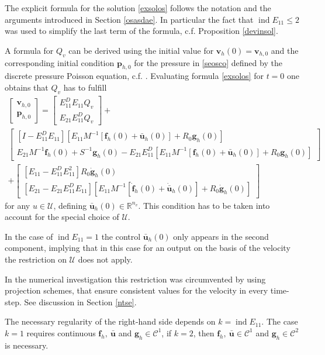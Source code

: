\documentclass[a4paper,10pt,BCOR=15mm]{scrbook}
\DeclareMathOperator{\ind}{ind}
\begin{document}
The explicit formula for the solution \eqref{exsolos} follows the notation and the arguments introduced in Section \ref{osasdae}. In particular the fact that $\ind E_{11} \leq 2$ was used to simplify the last term of the formula, c.f. Proposition \ref{devinsol}. 

\begin{rem}\label{inconin}
A formula for $Q_v$ can be derived using the initial value for $\mathbf v_h(0)= \mathbf v_{h,0}$ and the corresponding initial condition $\mathbf p_{h,0}$ for the pressure in \eqref{seosco} defined by the discrete pressure Poisson equation, c.f. \cite[p. 641]{gre2}.
Evaluating formula \eqref{exsolos} for $t=0$ one obtains that $Q_v$ has to fulfill
\begin{multline}
 \begin{bmatrix} \mathbf v_{h,0} \\ \mathbf p_{h,0} \end{bmatrix} = \begin{bmatrix} E_{11}^DE_{11}Q_v \\ E_{21}  E_{11}^DQ_v \end{bmatrix} + \\
 \begin{bmatrix} [I-E_{11}^D E_{11}] [E_{11}M^{-1}[\mathbf f_h (0)+ \bar {\mathbf u}_h(0)] + R_0 \mathbf g_h(0) ]\\  E_{21}M^{-1}\mathbf f_h(0)+S^{-1}\mathbf g_h(0)-E_{21}E_{11}^D [E_{11}M^{-1}[\mathbf f_h(0) + \bar {\mathbf u}_h(0)] + R_0 \mathbf g_h(0) ]  \end{bmatrix} \\ 
+\begin{bmatrix}[E_{11}-E_{11}^D E_{11}^2]  R_0\dot{ \mathbf g}_h(0)  \\ [E_{21}-E_{21}E_{11}^D E_{11}]  [E_{11}M^{-1}[\dot{\mathbf f}_h(0) + \dot{\bar {\mathbf u}}_h(0)] + R_0 \dot{\mathbf g}_h(0) ]\end{bmatrix}
\end{multline}
for any $u \in \mathcal U$, defining $\bar {\mathbf u}_h(0) \in \mathbb R^{n_v}$. This condition has to be taken into account for the special choice of $\mathcal U$. 

In the case of $\ind E_{11} =1$ the control $\bar {\mathbf u}_h(0)$ only appears in the second component, implying that in this case for an output on the basis of the velocity the restriction on $\mathcal U$ does not apply. 

In the numerical investigation this restriction was circumvented by using projection schemes, that ensure consistent values for the velocity in every time-step. See discussion in Section \ref{ntse}.
\end{rem}
\begin{rem}
The necessary regularity of the right-hand side depends on $k = \ind E_{11}$. The case $k=1$ requires continuous $\mathbf f_h, ~\bar {\mathbf u}$ and $\mathbf g_h \in \mathcal C^1$, if $k=2$, then $\mathbf f_h, ~\bar {\mathbf u} \in \mathcal C^1$ and $\mathbf g_h \in \mathcal C^2$ is necessary.
\end{rem}
\end{document}
